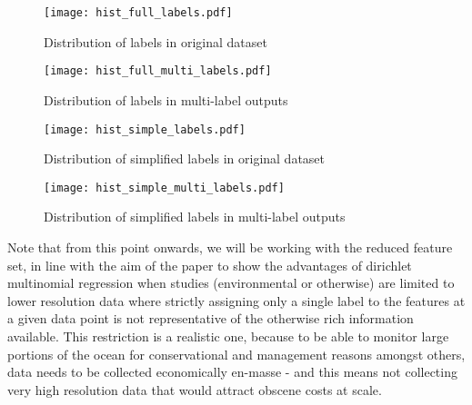 \begin{figure}[H]
    \begin{minipage}{.47\linewidth}
        \texttt{[image: hist\_full\_labels.pdf]}
        \caption{Distribution of labels in original dataset}
        \label{fig:singlelabeldistr}
    \end{minipage}
    \hfill
    \begin{minipage}{.47\linewidth}
        \texttt{[image: hist\_full\_multi\_labels.pdf]}
        \caption{Distribution of labels in multi-label outputs}
        \label{fig:multilabeldistr}
    \end{minipage}
\end{figure}

\begin{figure}[H]
    \begin{minipage}{.47\linewidth}
        \texttt{[image: hist\_simple\_labels.pdf]}
        \caption{Distribution of simplified labels in original dataset}
        \label{fig:singlelabeldistr}
    \end{minipage}
    \hfill
    \begin{minipage}{.47\linewidth}
        \texttt{[image: hist\_simple\_multi\_labels.pdf]}
        \caption{Distribution of simplified labels in multi-label outputs}
        \label{fig:multilabeldistr}
    \end{minipage}
\end{figure}

Note that from this point onwards, we will be working with the reduced feature set, in line with the aim of the paper to show the advantages of dirichlet multinomial regression when studies (environmental or otherwise) are limited to lower resolution data where strictly assigning only a single label to the features at a given data point is not representative of the otherwise rich information available. This restriction is a realistic one, because to be able to monitor large portions of the ocean for conservational and management reasons amongst others, data needs to be collected economically en-masse - and this means not collecting very high resolution data that would attract obscene costs at scale.

